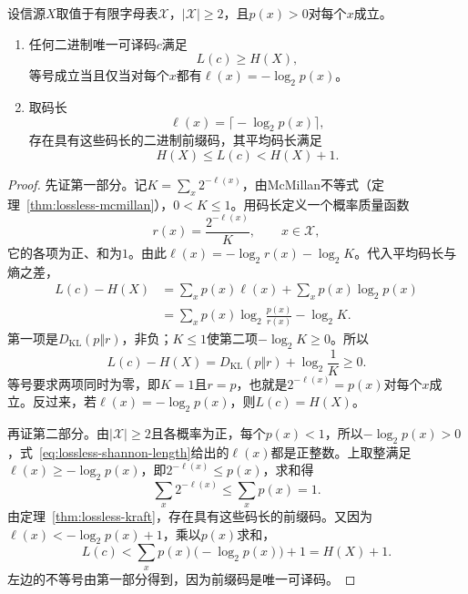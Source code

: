 \begin{theorem}[平均码长的熵界]
\label{thm:lossless-entropy-bound}
设信源$X$取值于有限字母表$\mathcal{X}$，$\lvert\mathcal{X}\rvert\geq2$，且$p(x)>0$对每个$x$成立。
\begin{enumerate}
 \item 任何二进制唯一可译码$c$满足
 \begin{equation}
  L(c)\geq H(X),
  \label{eq:lossless-lower-bound}
 \end{equation}
 等号成立当且仅当对每个$x$都有$\ell(x)=-\log_2p(x)$。
 \item 取码长
 \begin{equation}
  \ell(x)=\bigl\lceil-\log_2p(x)\bigr\rceil ,
  \label{eq:lossless-shannon-length}
 \end{equation}
 存在具有这些码长的二进制前缀码，其平均码长满足
 \begin{equation}
  H(X)\leq L(c)<H(X)+1 .
  \label{eq:lossless-upper-bound}
 \end{equation}
\end{enumerate}
\end{theorem}

\begin{proof}
先证第一部分。记$K=\sum_x2^{-\ell(x)}$，由McMillan不等式（定理~\ref{thm:lossless-mcmillan}），$0<K\leq1$。用码长定义一个概率质量函数
\[
 r(x)=\frac{2^{-\ell(x)}}{K},\qquad x\in\mathcal{X},
\]
它的各项为正、和为$1$。由此$\ell(x)=-\log_2r(x)-\log_2K$。代入平均码长与熵之差，
\[
 \begin{aligned}
 L(c)-H(X)&=\sum_xp(x)\ell(x)+\sum_xp(x)\log_2p(x)\\
 &=\sum_xp(x)\log_2\frac{p(x)}{r(x)}-\log_2K .
 \end{aligned}
\]
第一项是$D_{\mathrm{KL}}(p\Vert r)$，非负；$K\leq1$使第二项$-\log_2K\geq0$。所以
\[
 L(c)-H(X)=D_{\mathrm{KL}}(p\Vert r)+\log_2\frac1K\geq0 .
\]
等号要求两项同时为零，即$K=1$且$r=p$，也就是$2^{-\ell(x)}=p(x)$对每个$x$成立。反过来，若$\ell(x)=-\log_2p(x)$，则$L(c)=H(X)$。

再证第二部分。由$\lvert\mathcal{X}\rvert\geq2$且各概率为正，每个$p(x)<1$，所以$-\log_2p(x)>0$，式~\eqref{eq:lossless-shannon-length}给出的$\ell(x)$都是正整数。上取整满足$\ell(x)\geq-\log_2p(x)$，即$2^{-\ell(x)}\leq p(x)$，求和得
\[
 \sum_x2^{-\ell(x)}\leq\sum_xp(x)=1 .
\]
由定理~\ref{thm:lossless-kraft}，存在具有这些码长的前缀码。又因为$\ell(x)<-\log_2p(x)+1$，乘以$p(x)$求和，
\[
 L(c)<\sum_xp(x)\bigl(-\log_2p(x)\bigr)+1=H(X)+1 .
\]
左边的不等号由第一部分得到，因为前缀码是唯一可译码。
\end{proof}

